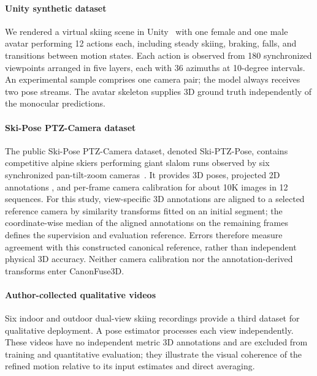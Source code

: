 \documentclass[preprint,12pt]{elsarticle}
\providecommand{\DIFaddbegin}{} %
\providecommand{\DIFaddend}{} %
\providecommand{\DIFadd}[1]{{\protect\color{blue}#1}} %
\begin{document}
\paragraph{Unity synthetic dataset}
We rendered a virtual skiing scene in Unity~\cite{juliani2020} with one female and one male avatar performing 12 actions each, including steady skiing, \DIFaddbegin \DIFadd{braking, }\DIFaddend falls, and transitions \DIFaddbegin \DIFadd{between motion states}\DIFaddend . Each action is observed from 180 synchronized viewpoints arranged in five layers, each with 36 azimuths at 10-degree intervals. An experimental sample comprises one camera pair; the model always receives two pose streams. The avatar skeleton supplies 3D ground truth independently of the monocular predictions.

\paragraph{Ski-Pose PTZ-Camera dataset}
The public Ski-Pose PTZ-Camera dataset, denoted Ski-PTZ-Pose, contains competitive alpine skiers performing giant slalom runs \DIFaddbegin \DIFadd{observed by six synchronized pan-tilt-zoom cameras}\DIFaddend ~\cite{rhodin2018learning,ski_poseptz_dataset}. It provides 3D poses, projected 2D annotations , and per-frame  \DIFaddbegin \DIFadd{camera calibration for about 10K images in 12 sequences}\DIFaddend . For this study, view-specific 3D annotations are aligned to a selected reference camera by similarity transforms fitted on an initial segment; the coordinate-wise median of the aligned annotations on the remaining frames defines the supervision and evaluation reference. Errors therefore measure agreement with this constructed canonical reference, rather than independent physical 3D accuracy. Neither camera calibration nor the annotation-derived transforms enter CanonFuse3D.

\paragraph{Author-collected qualitative videos}
Six indoor and outdoor dual-view skiing recordings provide a third dataset for qualitative deployment. A pose estimator processes each view independently. These videos have no independent metric 3D annotations and are excluded from training and quantitative evaluation; they illustrate the visual coherence of the refined motion relative to its input estimates and direct averaging.
\end{document}
